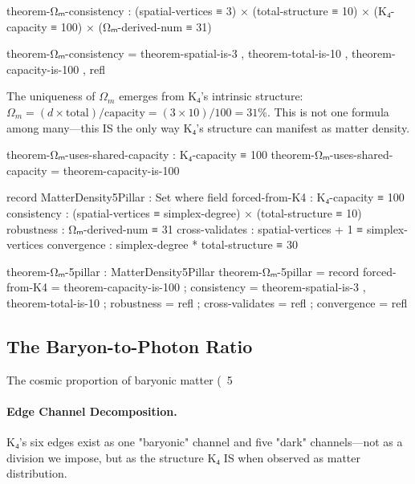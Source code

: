 \documentclass[11pt,a4paper]{book}
\begin{document}
\begin{code}
theorem-Ωₘ-consistency : (spatial-vertices ≡ 3)
                       × (total-structure ≡ 10)
                       × (K₄-capacity ≡ 100)
                       × (Ωₘ-derived-num ≡ 31)

theorem-Ωₘ-consistency = theorem-spatial-is-3 
                       , theorem-total-is-10
                       , theorem-capacity-is-100
                       , refl
\end{code}

The uniqueness of $\Omega_m$ emerges from K₄'s intrinsic structure:
$\Omega_m = (d \times \text{total}) / \text{capacity} = (3 \times 10) / 100 = 31\%$.
This is not one formula among many—this IS the only way K₄'s structure can manifest as matter density.

\begin{code}
theorem-Ωₘ-uses-shared-capacity : K₄-capacity ≡ 100
theorem-Ωₘ-uses-shared-capacity = theorem-capacity-is-100

record MatterDensity5Pillar : Set where
  field
    forced-from-K4  : K₄-capacity ≡ 100
    consistency     : (spatial-vertices ≡ simplex-degree) × (total-structure ≡ 10)
    robustness      : Ωₘ-derived-num ≡ 31
    cross-validates : spatial-vertices + 1 ≡ simplex-vertices
    convergence     : simplex-degree * total-structure ≡ 30

theorem-Ωₘ-5pillar : MatterDensity5Pillar
theorem-Ωₘ-5pillar = record
  { forced-from-K4  = theorem-capacity-is-100
  ; consistency     = theorem-spatial-is-3 , theorem-total-is-10
  ; robustness      = refl
  ; cross-validates = refl
  ; convergence     = refl
  }
\end{code}

\subsection{The Baryon-to-Photon Ratio}

The cosmic proportion of baryonic matter (~5%

\paragraph{Edge Channel Decomposition.}
K₄'s six edges exist as one "baryonic" channel and five "dark" channels—not as a division we impose, but as the structure K₄ IS when observed as matter distribution.
\end{document}
